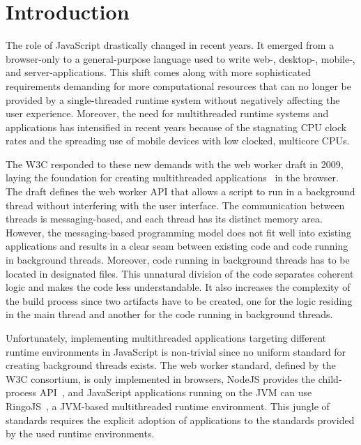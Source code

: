 \section{Introduction}\label{sec:introduction}
The role of JavaScript drastically changed in recent years. It emerged from a browser-only to a general-purpose language used to write web-, desktop-, mobile-, and server-applications. This shift comes along with more sophisticated requirements demanding for more computational resources that can no longer be provided by a single-threaded runtime system without negatively affecting the user experience. Moreover, the need for multithreaded runtime systems and applications has intensified in recent years because of the stagnating CPU clock rates and the spreading use of mobile devices with low clocked, multicore CPUs.

The W3C responded to these new demands with the web worker draft in 2009, laying the foundation for creating multithreaded applications~\cite{w3cWebWorker} in the browser. The draft defines the web worker API that allows a script to run in a background thread without interfering with the user interface. The communication between threads is messaging-based, and each thread has its distinct memory area. However, the messaging-based programming model does not fit well into existing applications and results in a clear seam between existing code and code running in background threads. Moreover, code running in background threads has to be located in designated files. This unnatural division of the code separates coherent logic and makes the code less understandable. It also increases the complexity of the build process since two artifacts have to be created, one for the logic residing in the main thread and another for the code running in background threads. 

Unfortunately, implementing multithreaded applications targeting different runtime environments in JavaScript is non-trivial since no uniform standard for creating background threads exists. The web worker standard, defined by the W3C consortium, is only implemented in browsers, NodeJS provides the child-process API~\cite{childProcess}, and JavaScript applications running on the JVM can use RingoJS~\cite{RingoJS}, a JVM-based multithreaded runtime environment. This jungle of standards requires the explicit adoption of applications to the standards provided by the used runtime environments.

